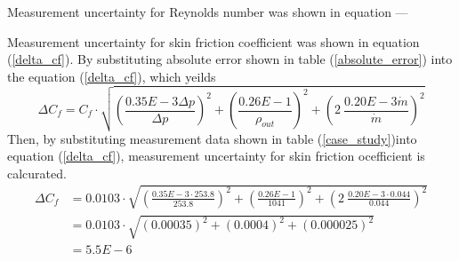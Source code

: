 \documentclass[12pt,oneside]{jbook}
\begin{document}
Measurement uncertainty for Reynolds number was shown in equation ---


Measurement uncertainty for skin friction coefficient was shown in equation (\ref{delta_cf}).
By substituting absolute error shown in table (\ref{absolute_error}) into the equation (\ref{delta_cf}), which yeilds
\begin{equation}
   \Delta C_{f} = C_{f} \cdot \sqrt{\left( \frac{0.35E-3\Delta p}{\Delta p}\right)^{2} + \left(\frac{0.26E-1}{\rho_{out}}\right)^{2} + \left( 2\ \frac{0.20E-3\dot{m}}{\dot{m}}\right)^{2}}
   \label{case_study_cf1}
\end{equation}
Then, by substituting measurement data shown in table (\ref{case_study})into equation (\ref{delta_cf}), measurement uncertainty for skin friction ocefficient is calcurated.
\begin{align}
    \Delta C_{f} & = 0.0103 \cdot \sqrt{\left( \frac{0.35E-3\cdot 253.8}{253.8}\right)^{2} + \left(\frac{0.26E-1}{1041}\right)^{2} +   \left( 2\ \frac{0.20E-3\cdot 0.044}{0.044}\right)^{2}}\\
    &= 0.0103 \cdot \sqrt{ \left( 0.00035 \right)^{2} + \left( 0.0004 \right)^{2} + \left( 0.000025 \right)^{2} }\\
    &= 5.5E-6
   \label{case_study_cf2}
\end{align}
\end{document}
